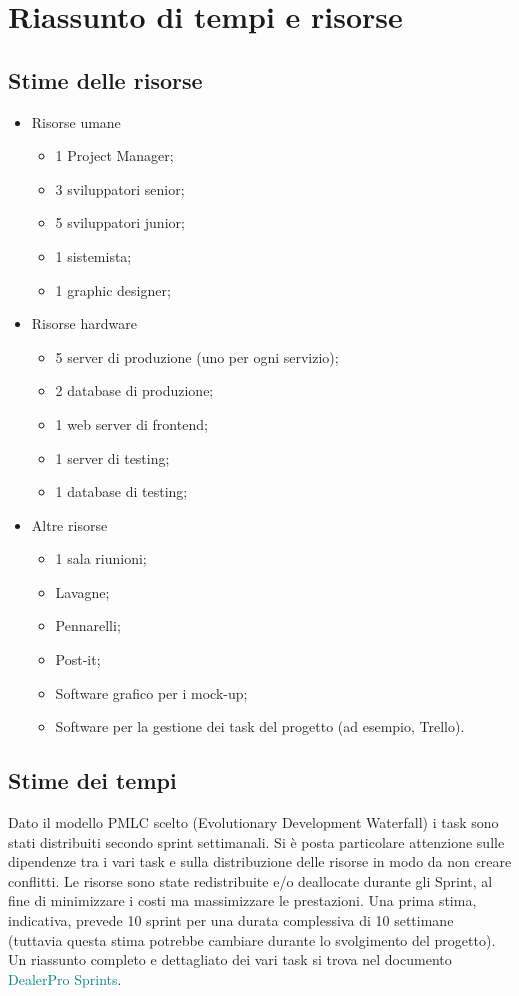 \documentclass{article}
\begin{document}
  \newpage
  \section{Riassunto di tempi e risorse}

  \subsection{Stime delle risorse}
  \begin{itemize}
    \item Risorse umane
    \begin{itemize}
      \item 1 Project Manager;
      \item 3 sviluppatori senior;
      \item 5 sviluppatori junior;
      \item 1 sistemista;
      \item 1 graphic designer;
    \end{itemize}
    \item Risorse hardware
    \begin{itemize}
      \item 5 server di produzione (uno per ogni servizio);
      \item 2 database di produzione;
      \item 1 web server di frontend;
      \item 1 server di testing;
      \item 1 database di testing;
    \end{itemize}
    \item Altre risorse
    \begin{itemize}
      \item 1 sala riunioni;
      \item Lavagne;
      \item Pennarelli;
      \item Post-it;
      \item Software grafico per i mock-up;
      \item Software per la gestione dei task del progetto (ad esempio, Trello).
    \end{itemize}
  \end{itemize}

  \subsection{Stime dei tempi}

  Dato il modello PMLC scelto (Evolutionary Development Waterfall) i task sono stati distribuiti secondo sprint
    settimanali. Si è posta particolare attenzione sulle dipendenze tra i vari task e sulla distribuzione delle 
    risorse in modo da non creare conflitti.
    Le risorse sono state redistribuite e/o deallocate durante gli Sprint, al fine di minimizzare i costi 
    ma massimizzare le prestazioni.
    Una prima stima, indicativa, prevede 10 sprint per una durata complessiva di 10 settimane 
    (tuttavia questa stima potrebbe cambiare durante lo svolgimento del progetto). 
    Un riassunto completo e dettagliato dei vari task si trova nel documento \textcolor{teal}{DealerPro Sprints}.
\end{document}

